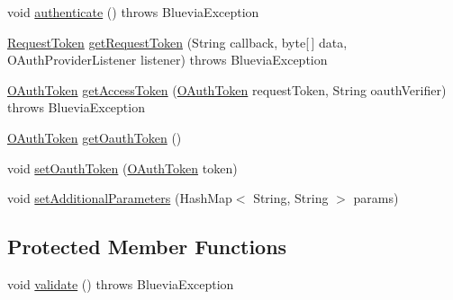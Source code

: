 \begin{DoxyCompactItemize}
\item 
void \hyperlink{classcom_1_1bluevia_1_1commons_1_1connector_1_1http_1_1oauth_1_1OauthHttpConnector_a8e4bf0338b25e614868fe4603d6aab83}{authenticate} ()  throws BlueviaException 
\item 
\hyperlink{classcom_1_1bluevia_1_1commons_1_1connector_1_1http_1_1oauth_1_1RequestToken}{RequestToken} \hyperlink{classcom_1_1bluevia_1_1commons_1_1connector_1_1http_1_1oauth_1_1OauthHttpConnector_aa02bfcf6f64218b4d86869dedad95da5}{getRequestToken} (String callback, byte\mbox{[}$\,$\mbox{]} data, OAuthProviderListener listener)  throws BlueviaException 
\item 
\hyperlink{classcom_1_1bluevia_1_1commons_1_1connector_1_1http_1_1oauth_1_1OAuthToken}{OAuthToken} \hyperlink{classcom_1_1bluevia_1_1commons_1_1connector_1_1http_1_1oauth_1_1OauthHttpConnector_a7f0f187330bd1ebf661124f82de22a9b}{getAccessToken} (\hyperlink{classcom_1_1bluevia_1_1commons_1_1connector_1_1http_1_1oauth_1_1OAuthToken}{OAuthToken} requestToken, String oauthVerifier)  throws BlueviaException 
\item 
\hyperlink{classcom_1_1bluevia_1_1commons_1_1connector_1_1http_1_1oauth_1_1OAuthToken}{OAuthToken} \hyperlink{classcom_1_1bluevia_1_1commons_1_1connector_1_1http_1_1oauth_1_1OauthHttpConnector_a123bfc9cd1f46d517dac019d380a25f6}{getOauthToken} ()
\item 
void \hyperlink{classcom_1_1bluevia_1_1commons_1_1connector_1_1http_1_1oauth_1_1OauthHttpConnector_ab301141b15ea7a1ec5b8c543e2eff1c0}{setOauthToken} (\hyperlink{classcom_1_1bluevia_1_1commons_1_1connector_1_1http_1_1oauth_1_1OAuthToken}{OAuthToken} token)
\item 
void \hyperlink{classcom_1_1bluevia_1_1commons_1_1connector_1_1http_1_1oauth_1_1OauthHttpConnector_a015368087e1b0779ce58902593ba6668}{setAdditionalParameters} (HashMap$<$ String, String $>$ params)
\end{DoxyCompactItemize}
\subsection*{Protected Member Functions}
\begin{DoxyCompactItemize}
\item 
void \hyperlink{classcom_1_1bluevia_1_1commons_1_1connector_1_1http_1_1oauth_1_1OauthHttpConnector_a6658c9709fbbc03b1177d1ca80d9c9ae}{validate} ()  throws BlueviaException 
\end{DoxyCompactItemize}
